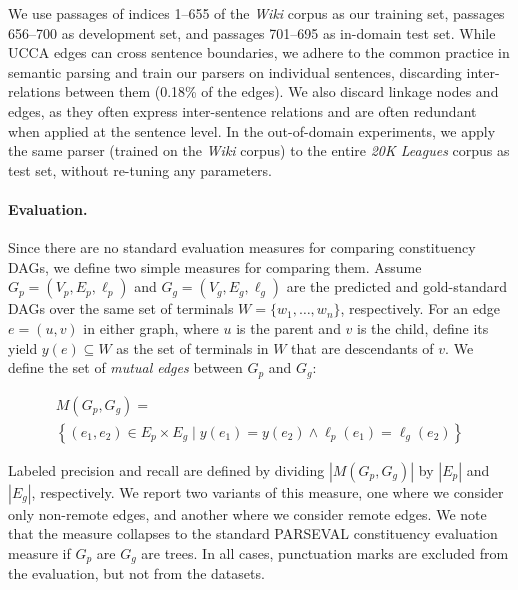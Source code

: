 \documentclass[11pt]{article}
\begin{document}
We use passages of indices 1--655
of the \textit{Wiki} corpus as our training set, passages 656--700 as development set,
and passages 701--695 as in-domain test set.
While UCCA edges can cross sentence boundaries, we adhere to the common
practice in semantic parsing and train our parsers on individual sentences,
discarding inter-relations between them (0.18\% of the edges).
We also discard linkage nodes and edges, as they often express inter-sentence
relations and are often redundant when applied at the sentence level.
In the out-of-domain experiments, we apply the same parser
(trained on the \textit{Wiki} corpus) to the entire \textit{20K Leagues}
corpus as test set, without re-tuning any parameters.

\paragraph{Evaluation.}
Since there are no standard evaluation measures for comparing constituency DAGs, we define
two simple measures for comparing them.
Assume $G_p=(V_p,E_p,\ell_p)$ and $G_g=(V_g,E_g,\ell_g)$
are the predicted and gold-standard DAGs over the same
set of terminals $W = \{w_1,\ldots,w_n\}$, respectively.
For an edge $e=(u,v)$ in either graph,
where $u$ is the parent and $v$ is the child, define its yield $y(e) \subseteq W$ as the
set of terminals in $W$ that are descendants of $v$.
We define the set of \textit{mutual edges} between $G_p$ and $G_g$:

\vspace{-.5cm}

{\small
\begin{multline*}
    M(G_p,G_g) = \\
    \left\{(e_1,e_2) \in E_p \times E_g \;|\;
    y(e_1) = y(e_2) \wedge \ell_p(e_1)=\ell_g(e_2)\right\}
\end{multline*}
}

\vspace{-.5cm}

Labeled precision and recall are defined by dividing $|M(G_p,G_g)|$ by $|E_p|$ and $|E_g|$, respectively.
We report two variants of this measure, one where we consider only non-remote edges,
and another where we consider remote edges. We note that the measure collapses to the standard
PARSEVAL constituency evaluation measure if $G_p$ are $G_g$ are trees.
In all cases, punctuation marks are excluded from the evaluation, but not from the datasets.
\end{document}
